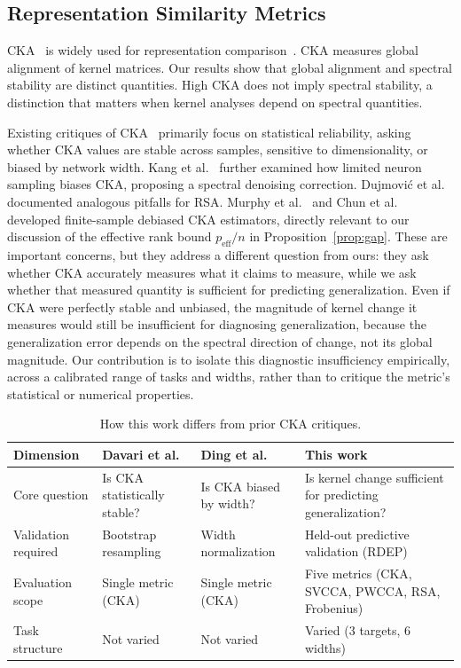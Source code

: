 \documentclass[twoside,11pt]{article}
\begin{document}
\subsection{Representation Similarity Metrics}
CKA~\citep{kornblith2019similarity} is widely used for representation comparison~\citep{raghu2017svcca,morcos2018insights,klabunde2023similarity}.  CKA measures global alignment of kernel matrices.  Our results show that global alignment and spectral stability are distinct quantities.  High CKA does not imply spectral stability, a distinction that matters when kernel analyses depend on spectral quantities.

Existing critiques of CKA~\citep{davari2022reliability,ding2021grounding} primarily focus on statistical reliability, asking whether CKA values are stable across samples, sensitive to dimensionality, or biased by network width.  Kang et al.~\cite{kang2025spectral} further examined how limited neuron sampling biases CKA, proposing a spectral denoising correction.  Dujmović et al.~\cite{dujmovic2025pitfalls} documented analogous pitfalls for RSA.  Murphy et al.~\cite{murphy2024cka} and Chun et al.~\cite{chun2025debias} developed finite-sample debiased CKA estimators, directly relevant to our discussion of the effective rank bound $p_{\text{eff}} / n$ in Proposition~\ref{prop:gap}.  These are important concerns, but they address a different question from ours: they ask whether CKA accurately measures what it claims to measure, while we ask whether that measured quantity is sufficient for predicting generalization.  Even if CKA were perfectly stable and unbiased, the magnitude of kernel change it measures would still be insufficient for diagnosing generalization, because the generalization error depends on the spectral direction of change, not its global magnitude.  Our contribution is to isolate this diagnostic insufficiency empirically, across a calibrated range of tasks and widths, rather than to critique the metric's statistical or numerical properties.

\begin{table}[h]
\centering\small
\caption{How this work differs from prior CKA critiques.}
\label{tab:related_diff}
\begin{tabular}{p{3cm}p{3.2cm}p{3.2cm}p{3.2cm}}
\toprule
Dimension & Davari et al.~\cite{davari2022reliability} & Ding et al.~\cite{ding2021grounding} & This work \\
\midrule
Core question & Is CKA statistically stable? & Is CKA biased by width? & Is kernel change sufficient for predicting generalization? \\
Validation required & Bootstrap resampling & Width normalization & Held-out predictive validation (RDEP) \\
Evaluation scope & Single metric (CKA) & Single metric (CKA) & Five metrics (CKA, SVCCA, PWCCA, RSA, Frobenius) \\
Task structure & Not varied & Not varied & Varied (3 targets, 6 widths) \\
\bottomrule
\end{tabular}
\end{table}
\end{document}
